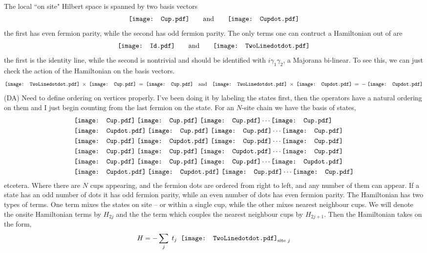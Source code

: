 \documentclass[12pt,a4paper]{article}
\newcommand{\dave}[1]{{\color{ao(english)}\footnotesize{(DA) #1}}}
\newcommand{\TwoLinedotdot}{\mathord{\vcenter{\hbox{\texttt{[image: TwoLinedotdot.pdf]}}}}}
\newcommand{\Id}{\mathord{\vcenter{\hbox{\texttt{[image: Id.pdf]}}}}}
\newcommand{\CupSigmadot}{\mathord{\vcenter{\hbox{\texttt{[image: Cupdot.pdf]}}}}}
\newcommand{\CupSigma}{\mathord{\vcenter{\hbox{\texttt{[image: Cup.pdf]}}}}}
\begin{document}
The local ``on site" Hilbert space is spanned by two basis vectors
\begin{align}
    \CupSigma \qquad \text{and} \qquad \CupSigmadot
\end{align}
the first has even fermion parity, while the second has odd fermion parity.
The only terms one can contruct a Hamiltonian out of are
\begin{align}
\Id \qquad \text{and} \qquad \TwoLinedotdot
\end{align}
the first is the identity line, while the second is nontrivial and should be identified with $i \gamma_1 \gamma_2$, a Majorana bi-linear.
To see this, we can just check the action of the Hamiltonian on the basis vectors. 
\begin{align}
\TwoLinedotdot\; \times \; \CupSigma \; =\;  \CupSigma \quad \text{and} \quad \TwoLinedotdot\; \times \; \CupSigmadot \; =\;   - \; \CupSigmadot
\end{align}
\dave{Need to define ordering on vertices properly. I've been doing it by labeling the states first, then the operators have a natural ordering on them and I just begin counting from the last fermion on the state.}
For an $N$-site chain we have the basis of states,
\begin{align}
&\CupSigma \; \CupSigma \; \CupSigma \cdots \CupSigma\\
&\CupSigmadot \; \CupSigma \; \CupSigma \cdots \CupSigma\\
&\CupSigma \; \CupSigmadot \; \CupSigma \cdots \CupSigma\\
&\CupSigma \; \CupSigma \; \CupSigmadot \cdots \CupSigma\\
&\CupSigma \; \CupSigma \; \CupSigma \cdots \CupSigmadot\\
&\CupSigmadot \; \CupSigmadot \; \CupSigma \cdots \CupSigma
\end{align}
etcetera. Where there are $N$ cups appearing, and the fermion dots are ordered from right to left, and any number of them can appear.
If a state has an odd number of dots it has odd fermion parity, while an even number of dots has even fermion parity.
The Hamiltonian has two types of terms. One term mixes the states on site -- or within a single cup, while the other mixes nearest neighbour cups.
We will denote the onsite Hamiltonian terms by $H_{2j}$ and the the term which couples the nearest neighbour cups by $H_{2j+1}$.
Then the Hamiltonian takes on the form,
\begin{align}
H = - \sum_j\; t_j \; \;  \TwoLinedotdot_{\text{site $j$}}
\end{align}
\end{document}
